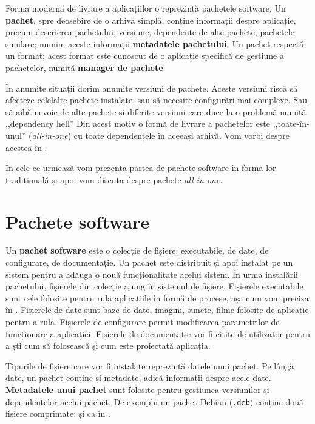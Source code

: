 Forma modernă de livrare a aplicațiilor o reprezintă pachetele software. Un \textbf{pachet}, spre deosebire de o arhivă simplă, conține informații despre aplicație, precum descrierea pachetului, versiune, dependențe de alte pachete, pachetele similare; numim aceste informații \textbf{metadatele pachetului}. Un pachet respectă un format; acest format este cunoscut de o aplicație specifică de gestiune a pachetelor, numită \textbf{manager de pachete}.

În anumite situații dorim anumite versiuni de pachete. Aceste versiuni riscă să afecteze celelalte pachete instalate, sau să necesite configurări mai complexe. Sau să aibă nevoie de alte pachete și diferite versiuni care duce la o problemă numită ,,dependency hell'' Din acest motiv o formă de livrare a pachetelor este ,,toate-în-unul'' (\textit{all-in-one}) cu toate dependențele în aceeași arhivă. Vom vorbi despre acestea în .

În cele ce urmează vom prezenta partea de pachete software în forma lor tradițională și apoi vom discuta despre pachete \textit{all-in-one}.

\section{Pachete software}
\label{sec:package:overview}

Un \textbf{pachet software} este o colecție de fișiere: executabile, de date, de configurare, de documentație. Un pachet este distribuit și apoi instalat pe un sistem pentru a adăuga o nouă funcționalitate acelui sistem. În urma instalării pachetului, fișierele din colecție ajung în sistemul de fișiere. Fișierele executabile sunt cele folosite pentru rula aplicațiile în formă de procese, așa cum vom preciza în . Fișierele de date sunt baze de date, imagini, sunete, filme folosite de aplicație pentru a rula. Fișierele de configurare permit modificarea parametrilor de funcționare a aplicației. Fișierele de documentație vor fi citite de utilizator pentru a ști cum să folosească și cum este proiectată aplicația.

Tipurile de fișiere care vor fi instalate reprezintă datele unui pachet. Pe lângă date, un pachet conține și metadate, adică informații despre acele date. \textbf{Metadatele unui pachet} sunt folosite pentru gestiunea versiunilor și dependențelor acelui pachet. De exemplu un pachet Debian (\texttt{.deb}) conține două fișiere comprimate:  și  ca în .

